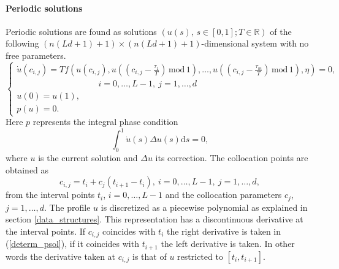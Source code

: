 \documentclass[10pt]{article}
\gdef \d{{\mathrm d}}
\gdef \RR{{\mathbb R}}
\begin{document}
{\paragraph{Periodic solutions}
Periodic solutions are found as solutions 
$(u(s),\,s\in[0,1];T\in\RR)$ of the following
$(n(Ld+1)+1)\times (n(Ld+1)+1)$-dimensional system with no free parameters. 
\begin{equation}\label{determ_psol}
\left\{
\begin{array}{l}
\dot{u}(c_{i,j})=
Tf(u(c_{i,j}),u((c_{i,j}-\frac{\tau_1}{T})\,\mathrm{mod}\,1),\ldots,
u((c_{i,j}-\frac{\tau_m}{T})\,\mathrm{mod}\,1),\eta)=0, \\
\hspace{4cm}i=0,\ldots,L-1,\ j=1,\ldots,d \\
u(0)=u(1), \\
p(u)=0.
\end{array}
\right.
\end{equation}
Here $p$ represents the integral phase condition
\begin{equation}\label{integral_phase_cond}
\int_0^1\dot{u}(s)\Delta u(s)\d s=0,
\end{equation}
where $u$ is the current solution and $\Delta u$ its correction.
The collocation points are obtained as 
\[
c_{i,j}=t_i+c_j(t_{i+1}-t_i),\ i=0,\ldots,L-1,\ j=1,\ldots,d,
\]
from the interval points $t_i$, $i=0,\ldots,L-1$ and the
collocation parameters $c_j$, $j=1,\ldots,d$.
The profile $u$ is discretized as a piecewise polynomial as
explained in section \ref{data_structures}.
This representation has a discontinuous derivative at the 
interval points. If $c_{i,j}$ coincides with $t_i$ the right derivative
is taken in (\ref{determ_psol}), if it coincides with $t_{i+1}$ the left
derivative is taken. In other words the derivative taken at $c_{i,j}$
is that of $u$ restricted to $[t_i,t_{i+1}]$.

}
\end{document}
